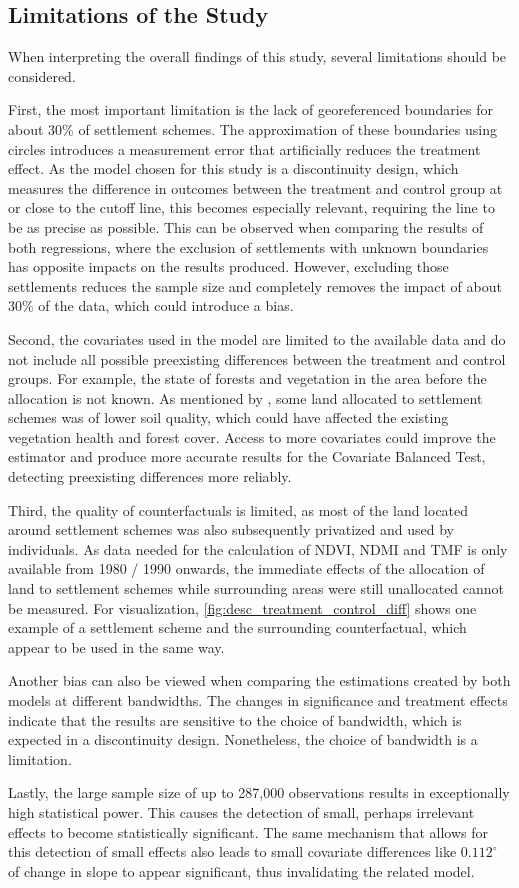 \subsection{Limitations of the Study}
\label{subsec:limitations}
When interpreting the overall findings of this study, several limitations should be considered.

First, the most important limitation is the lack of georeferenced boundaries for about $30\%$ of settlement schemes.
The approximation of these boundaries using circles introduces a measurement error that artificially reduces the treatment effect.
As the model chosen for this study is a discontinuity design, which measures the difference in outcomes between the treatment and control group at or close to the cutoff line, this becomes especially relevant, requiring the line to be as precise as possible.
This can be observed when comparing the results of both regressions, where the exclusion of settlements with unknown boundaries has opposite impacts on the results produced.
However, excluding those settlements reduces the sample size and completely removes the impact of about $30\%$ of the data, which could introduce a bias.

Second, the covariates used in the model are limited to the available data and do not include all possible preexisting differences between the treatment and control groups.
For example, the state of forests and vegetation in the area before the allocation is not known.
As mentioned by \cite{leoLandClassKenya1984}, some land allocated to settlement schemes was of lower soil quality, which could have affected the existing vegetation health and forest cover.
Access to more covariates could improve the estimator and produce more accurate results for the Covariate Balanced Test, detecting preexisting differences more reliably.

Third, the quality of counterfactuals is limited, as most of the land located around settlement schemes was also subsequently privatized and used by individuals.
As data needed for the calculation of NDVI, NDMI and TMF is only available from 1980 / 1990 onwards, the immediate effects of the allocation of land to settlement schemes while surrounding areas were still unallocated cannot be measured.
For visualization, \cref{fig:desc_treatment_control_diff} shows one example of a settlement scheme and the surrounding counterfactual, which appear to be used in the same way.

Another bias can also be viewed when comparing the estimations created by both models at different bandwidths.
The changes in significance and treatment effects indicate that the results are sensitive to the choice of bandwidth, which is expected in a discontinuity design.
Nonetheless, the choice of bandwidth is a limitation.

Lastly, the large sample size of up to 287,000 observations results in exceptionally high statistical power.
This causes the detection of small, perhaps irrelevant effects to become statistically significant.
The same mechanism that allows for this detection of small effects also leads to small covariate differences like $0.112^\circ$ of change in slope to appear significant, thus invalidating the related model.